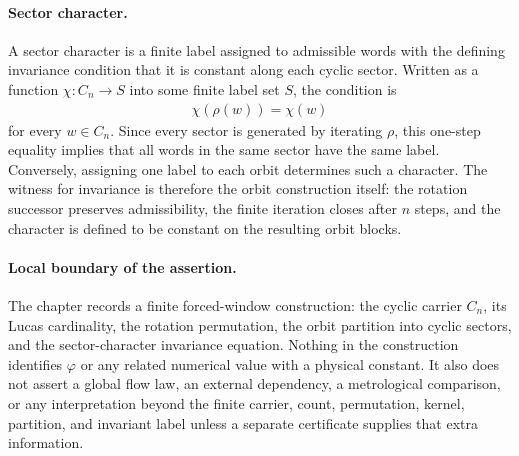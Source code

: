 \paragraph{Sector character.}
A sector character is a finite label assigned to admissible words with the defining invariance condition that it is constant along each cyclic sector. Written as a function $\chi:C_n\to S$ into some finite label set $S$, the condition is
$$
\begin{aligned}
\chi(\rho(w))=\chi(w)
\end{aligned}
$$
for every $w\in C_n$. Since every sector is generated by iterating $\rho$, this one-step equality implies that all words in the same sector have the same label. Conversely, assigning one label to each orbit determines such a character. The witness for invariance is therefore the orbit construction itself: the rotation successor preserves admissibility, the finite iteration closes after $n$ steps, and the character is defined to be constant on the resulting orbit blocks.

\paragraph{Local boundary of the assertion.}
The chapter records a finite forced-window construction: the cyclic carrier $C_n$, its Lucas cardinality, the rotation permutation, the orbit partition into cyclic sectors, and the sector-character invariance equation. Nothing in the construction identifies $\varphi$ or any related numerical value with a physical constant. It also does not assert a global flow law, an external dependency, a metrological comparison, or any interpretation beyond the finite carrier, count, permutation, kernel, partition, and invariant label unless a separate certificate supplies that extra information.
